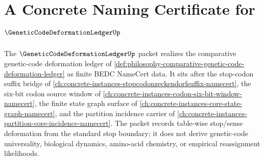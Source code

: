 \chapter{A Concrete Naming Certificate for $\GeneticCodeDeformationLedgerUp$}
\label{ch:concrete-instances-genetic-code-deformation-ledger-namecert}

The $\GeneticCodeDeformationLedgerUp$ packet realizes the comparative genetic-code deformation ledger of \autoref{def:philosophy-comparative-genetic-code-deformation-ledger} as finite BEDC NameCert data. It sits after the stop-codon suffix bridge of \autoref{ch:concrete-instances-stopcodonzeckendorfsuffix-namecert}, the six-bit codon source window of \autoref{ch:concrete-instances-codon-six-bit-window-namecert}, the finite state graph surface of \autoref{ch:concrete-instances-core-state-graph-namecert}, and the partition incidence carrier of \autoref{ch:concrete-instances-partition-core-incidence-namecert}. The packet records table-wise stop/sense deformation from the standard stop boundary; it does not derive genetic-code universality, biological dynamics, amino-acid chemistry, or empirical reassignment likelihoods.

